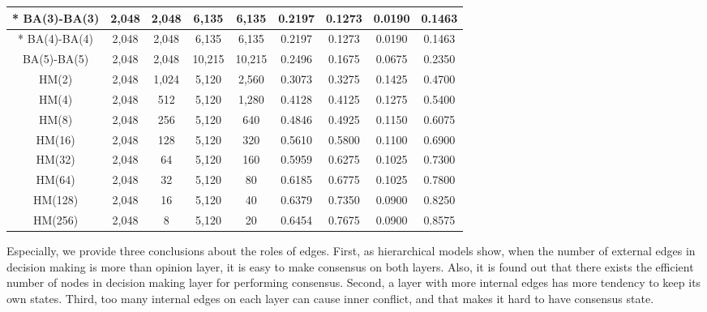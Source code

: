 \begin{table}[!htb]
\begin{center}
\begin{tabular}{c|c|c|c|c|c|c|c|c}
		*	BA(3)-BA(3)            & 2,048 	& 2,048   & 6,135   & 6,135   & 0.2197    & 0.1273 & 0.0190 & 0.1463   \\ \hline
		*   BA(4)-BA(4)            & 2,048 	& 2,048   & 6,135   & 6,135   & 0.2197    & 0.1273 & 0.0190 & 0.1463   \\ \hline
			BA(5)-BA(5)            & 2,048 	& 2,048   & 10,215  & 10,215  &  0.2496   & 0.1675 & 0.0675 & 0.2350   \\ \hline
			HM(2)  				   & 2,048 	& 1,024   & 5,120   & 2,560   &  0.3073   & 0.3275 & 0.1425 & 0.4700   \\ \hline    
			HM(4) 				   & 2,048 	&  512    & 5,120   & 1,280   &  0.4128   & 0.4125 & 0.1275 & 0.5400   \\ \hline
			HM(8)  				   & 2,048 	&  256    & 5,120   & 640     &  0.4846   & 0.4925 & 0.1150 & 0.6075   \\ \hline
			HM(16)				   & 2,048 	&  128    & 5,120   & 320     &  0.5610   & 0.5800 & 0.1100 & 0.6900   \\ \hline
			HM(32) 				   & 2,048 	&   64    & 5,120   & 160     &  0.5959   & 0.6275 & 0.1025 & 0.7300   \\ \hline
			HM(64) 				   & 2,048 	&   32    & 5,120   & 80      &  0.6185   & 0.6775 & 0.1025 & 0.7800   \\ \hline 
			HM(128) 			   & 2,048 	&   16    & 5,120   & 40      &  0.6379   & 0.7350 & 0.0900 & 0.8250   \\ \hline 
			HM(256) 			   & 2,048 	&    8    & 5,120   & 20      &  0.6454   & 0.7675 & 0.0900 & 0.8575   \\ \hline 
			 \hline
		\end{tabular}

	\end{center}
\end{table} 

 Especially, we provide three conclusions about the roles of edges. First, as hierarchical models show, when the number of external edges in decision making is more than opinion layer, it is easy to make consensus on both layers.  Also, it is found out that there exists the efficient number of nodes in decision making layer for performing consensus. Second, a layer with more internal edges has more tendency to keep its own states. Third, too many internal edges on each layer can cause inner conflict, and that makes it hard to have consensus state.  
